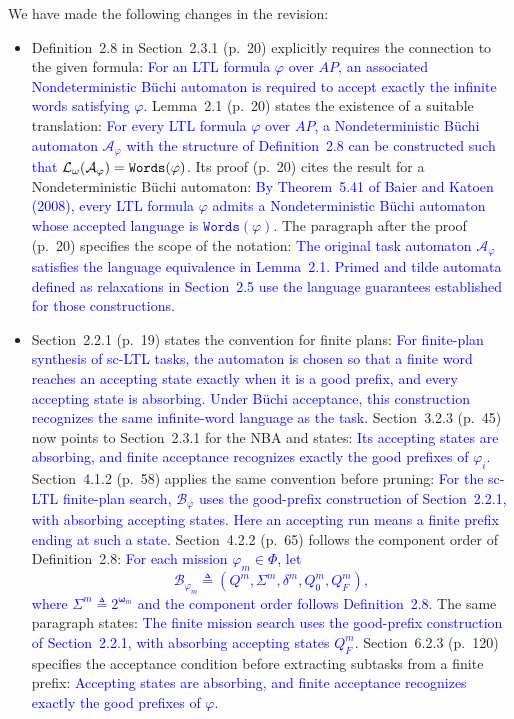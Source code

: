 \documentclass[11pt]{article}
\newcommand{\change}[1]{\textcolor{blue}{#1}}
\begin{document}
We have made the following changes in the revision:
\begin{itemize}
\item Definition~2.8 in Section~2.3.1 (p.~20) explicitly requires the
connection to the given formula:
\change{For an LTL formula $\varphi$ over $AP$, an associated Nondeterministic
B\"uchi automaton is required to accept exactly the infinite words
satisfying $\varphi$.}
Lemma~2.1 (p.~20) states the existence of a suitable translation:
\change{For every LTL formula $\varphi$ over $AP$, a Nondeterministic B\"uchi
automaton $\mathcal{A}_{\varphi}$ with the structure of
Definition~2.8 can be constructed such that
$\mathcal{L}_{\omega}(\mathcal{A}_{\varphi})
=\textup{\texttt{Words}}(\varphi)$.}
Its proof (p.~20) cites the result for a Nondeterministic B\"uchi automaton:
\change{By Theorem~5.41 of Baier and Katoen (2008), every LTL formula
$\varphi$ admits a Nondeterministic B\"uchi automaton whose accepted
language is $\texttt{Words}(\varphi)$.}
The paragraph after the proof (p.~20) specifies the scope of the notation:
\change{The original task automaton $\mathcal{A}_{\varphi}$ satisfies the language
equivalence in Lemma~2.1. Primed and tilde automata
defined as relaxations in Section~2.5 use the language
guarantees established for those constructions.}

\item Section~2.2.1 (p.~19) states the convention for finite plans:
\change{For finite-plan synthesis of sc-LTL tasks, the automaton is chosen so that
a finite word reaches an accepting state exactly when it is a good prefix,
and every accepting state is absorbing. Under B\"uchi acceptance, this
construction recognizes the same infinite-word language as the task.}
Section~3.2.3 (p.~45) now points to Section~2.3.1 for the NBA and states:
\change{Its accepting states are absorbing, and finite acceptance recognizes exactly
the good prefixes of $\varphi_i$.}
Section~4.1.2 (p.~58) applies the same convention before pruning:
\change{For the sc-LTL finite-plan search, $\mathcal{B}_{\varphi}$ uses the
good-prefix construction of Section~2.2.1, with absorbing
accepting states. Here an accepting run means a finite prefix ending at
such a state.}
Section~4.2.2 (p.~65) follows the component order of Definition~2.8:
\change{For each mission $\varphi_m \in \Phi$, let
\[
\mathcal{B}_{\varphi_m} \triangleq
(Q^m,\Sigma^m,\delta^m,Q_0^m,Q_F^m),
\]
where $\Sigma^m\triangleq 2^{\boldsymbol{\omega}_m}$ and the component order
follows Definition~2.8.}
The same paragraph states:
\change{The finite mission search uses the
good-prefix construction of Section~2.2.1, with absorbing
accepting states $Q_F^m$.}
Section~6.2.3 (p.~120) specifies the acceptance condition before extracting
subtasks from a finite prefix:
\change{Accepting states are absorbing, and finite acceptance recognizes
exactly the good prefixes of $\varphi$.}
\end{itemize}
\end{document}
